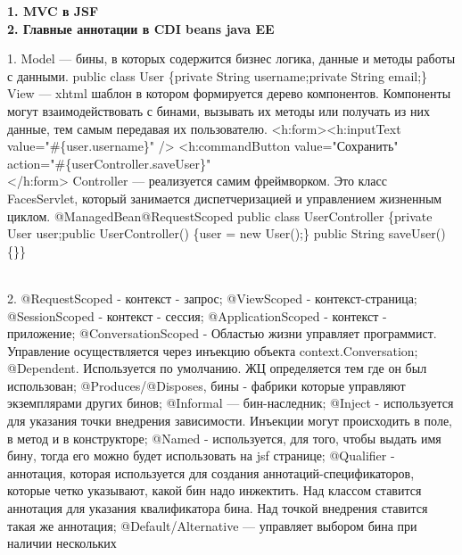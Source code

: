 \documentclass{article}
\newcommand{\bil}[4]{%
    \begin{minipage}{.3\textwidth}
        \textbf{1. #1} \\
        \textbf{2. #2}

        1. #3
        \\
        2. #4
    \end{minipage}
}
\begin{document}
\hfill
\bil{MVC в JSF}{Главные аннотации в CDI beans java EE}{
    Model — бины, в которых содержится бизнес логика, данные и методы работы с данными. 
    public class User \{private String username;private String email;\}
View — xhtml шаблон в котором формируется дерево компонентов. Компоненты могут взаимодействовать с бинами, вызывать их методы или получать из них данные, тем самым передавая их пользователю.
<h:form><h:inputText value="\#\{user.username\}" />
    <h:commandButton value="Сохранить" action="\#\{userController.saveUser\}"\\
</h:form>
Controller — реализуется самим фреймворком. Это класс FacesServlet, который занимается диспетчеризацией и управлением жизненным циклом.
@ManagedBean@RequestScoped public class UserController \{private User user;public UserController() \{user = new User();\}
public String saveUser() \{\}\}
}{
    @RequestScoped - контекст - запрос;
    @ViewScoped - контекст-страница;
    @SessionScoped - контекст - сессия;
    @ApplicationScoped - контекст - приложение;
    @ConversationScoped - Областью жизни управляет программист. Управление осуществляется через инъекцию объекта context.Conversation;
    @Dependent.  Используется по умолчанию. ЖЦ определяется тем где он был использован;
    @Produces/@Disposes, бины - фабрики которые управляют экземплярами других бинов;
    @Informal — бин-наследник;
    @Inject - используется для указания точки внедрения зависимости. Инъекции могут происходить в поле, в метод и в конструкторе;
    @Named - используется, для того, чтобы выдать имя бину, тогда его можно будет использовать на jsf странице;
    @Qualifier - аннотация, которая используется для создания аннотаций-спецификаторов, которые четко указывают, какой бин надо инжектить. Над классом ставится аннотация для указания квалификатора бина. Над точкой внедрения ставится такая же аннотация;
    @Default/Alternative — управляет выбором бина при наличии нескольких
}
\\
\end{document}
